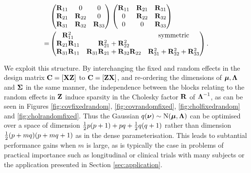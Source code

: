 \documentclass{amsart}[12pt]
\begin{document}
	\begin{align*}
		&\begin{pmatrix}
		{\bf R}_{11}          & 0                                    & 0                                     \\
		{\bf R}_{21}          & {\bf R}_{22}                             & 0                                     \\
		{\bf R}_{31}          & {\bf R}_{32}                             & {\bf R}_{33}                              
		\end{pmatrix}
		\begin{pmatrix}
		{\bf R}_{11}          & {\bf R}_{21}                             & {\bf R}_{31}                              \\
		0                 & {\bf R}_{22}                             & {\bf R}_{32}                              \\
		0                 & 0                                    & {\bf R}_{33}                              
		\end{pmatrix}
		\\
		=& \begin{pmatrix}
		{\bf R}_{11}^2        &                                      & \text{symmetric}                      \\
		{\bf R}_{21}{\bf R}_{11} & {\bf R}_{21}^2 + {\bf R}_{22}^2 \\
		{\bf R}_{31} {\bf R}_{11} & {\bf R}_{31}{\bf R}_{21} + {\bf R}_{32} {\bf R}_{22} & {\bf R}_{31}^2 + {\bf R}_{32} ^2 + {\bf R}_{33}^2 
		\end{pmatrix}.
	\end{align*}

	\noindent We exploit this structure. By interchanging the fixed and random effects in the design matrix ${\bf C} = [{\bf X} {\bf Z}]$ to ${\bf C} = [{\bf Z} {\bf X}]$, and re-ordering the dimensions of ${\boldsymbol \mu}, {\boldsymbol \Lambda}$ and ${\boldsymbol \Sigma}$ in the same manner, the independence between the
	blocks relating to the random effects in ${\bf Z}$ induce sparsity in the Cholesky factor ${\bf R}$ of
	${\boldsymbol \Lambda}^{-1}$, as can be seen in Figures \ref{fig:covfixedrandom}, \ref{fig:covrandomfixed},
	\ref{fig:cholfixedrandom} and \ref{fig:cholrandomfixed}. Thus the Gaussian $q({\boldsymbol \nu}) \sim \text{N}({\boldsymbol \mu}, {\boldsymbol \Lambda})$ can be optimised over a space of dimension $\tfrac{1}{2} p (p + 1) + pq + \tfrac{1}{2} q (q + 1)$ rather than dimension
	$\tfrac{1}{2} (p + mq) (p + mq + 1)$ as in the dense parameterisation. This leads to subtantial performance gains
	when $m$ is large, as is typically the case in problems of practical importance such as longitudinal or 
	clinical trials with many subjects or the application presented in Section \ref{sec:application}.
		
\end{document}
